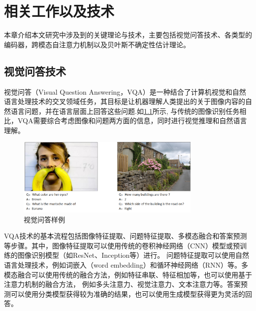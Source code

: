 \chapter{相关工作以及技术}
本章介绍本文研究中涉及到的关键理论与技术，主要包括视觉问答技术、各类型的编码器，跨模态自注意力机制以及贝叶斯不确定性估计理论。

\section{视觉问答技术}
视觉问答\cite{antol2015vqa}（Visual Question Answering，VQA）是一种结合了计算机视觉和自然语言处理技术的交叉领域任务，其目标是让机器理解人类提出的关于图像内容的自然语言问题，并在语言层面上回答这些问题.如\ref{vqademo}所示,
与传统的图像识别任务相比，VQA需要综合考虑图像和问题两方面的信息，同时进行视觉推理和自然语言理解。
\begin{figure}[htbp]
	\centering	
	\includegraphics[width=0.8\textwidth]{Fig/myfig/chapter2/vqademo.png}  %
	\caption{\label{vqademo}视觉问答样例} 
\end{figure}

VQA技术的基本流程包括图像特征提取、问题特征提取、多模态融合和答案预测等步骤。其中，图像特征提取可以使用传统的卷积神经网络（CNN）模型或预训练的图像识别模型（如ResNet、Inception等）进行。
问题特征提取可以使用自然语言处理技术，例如词嵌入\cite{}（word embedding）和循环神经网络（RNN）等。多模态融合可以使用传统的融合方法，例如特征串联、特征相加等，也可以使用基于注意力机制的融合方法，
例如多头注意力、视觉注意力、文本注意力等。答案预测可以使用分类模型获得较为准确的结果，也可以使用生成模型获得更为灵活的回答。

